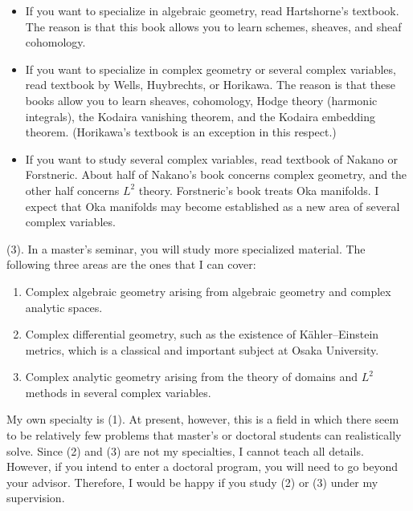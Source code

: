\begin{tcolorbox}[mybox]
\begin{itemize}[left=0pt]
  \setlength{\parskip}{0cm} %
  \setlength{\itemsep}{8pt} %
\item If you want to specialize in algebraic geometry, read Hartshorne's textbook. 
The reason is that this book allows you to learn schemes, sheaves, and sheaf cohomology.
\item If you want to specialize in complex geometry or several complex variables, read textbook by Wells, Huybrechts, or Horikawa. 
The reason is that these books allow you to learn sheaves, cohomology, Hodge theory (harmonic integrals), the Kodaira vanishing theorem, and the Kodaira embedding theorem. (Horikawa's textbook  is an exception in this respect.)
\item If you want to study several complex variables, read textbook of Nakano or Forstneric. 
About half of Nakano's book concerns complex geometry, and the other half concerns $L^2$ theory. Forstneric's book treats Oka manifolds. I expect that Oka manifolds may become established as a new area of several complex variables.
\end{itemize}
\end{tcolorbox}

(3). In a master's seminar, you will study more specialized material. The following three areas are the ones that I can cover:
\begin{enumerate}
  \setlength{\parskip}{0cm} %
  \setlength{\itemsep}{0pt} %
  \item Complex algebraic geometry arising from algebraic geometry and complex analytic spaces.
\item Complex differential geometry, such as the existence of K\"ahler--Einstein metrics, which is a classical and important subject at Osaka University.
\item Complex analytic geometry arising from the theory of domains and $L^2$ methods in several complex variables.
\end{enumerate}
My own specialty is (1). At present, however, this is a field in which there seem to be relatively few problems that master's or doctoral students can realistically solve. 
Since (2) and (3) are not my specialties, I cannot teach all details. However, if you intend to enter a doctoral program, you will need to go beyond your advisor. Therefore, I would be happy if you study (2) or (3) under my supervision.


